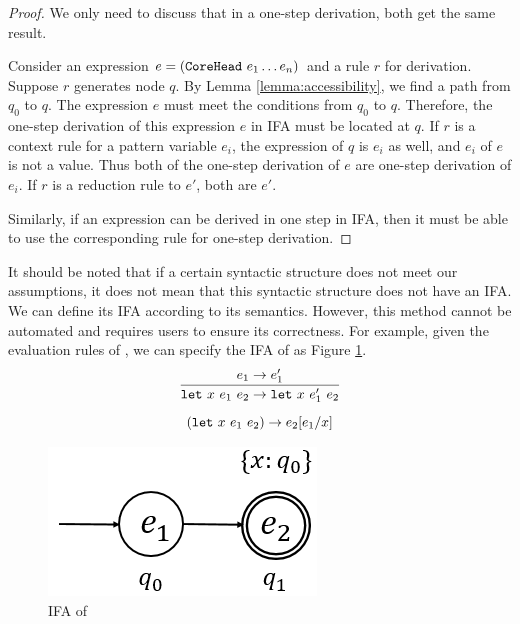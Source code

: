 \begin{proof}
    We only need to discuss that in a one-step derivation, both get the same result.

    Consider an expression $e=(\mbox{\tt CoreHead}~e_1 \ldots e_n)$ and a rule $r$ for derivation. Suppose $r$ generates node $q$. By Lemma \ref{lemma:accessibility}, we find a path from $q_0$ to $q$. The expression $e$ must meet the conditions from $q_0$ to $q$. Therefore, the one-step derivation of this expression $e$ in IFA must be located at $q$. If $r$ is a context rule for a pattern variable $e_i$, the expression of $q$ is $e_i$ as well, and $e_i$ of $e$ is not a value. Thus both of the one-step derivation of $e$ are one-step derivation of $e_i$. If $r$ is a reduction rule to $e'$, both are $e'$.

    Similarly, if an expression can be derived in one step in IFA, then it must be able to use the corresponding rule for one-step derivation.
\end{proof}


It should be noted that if a certain syntactic structure does not meet our assumptions, it does not mean that this syntactic structure does not have an IFA. We can define its IFA according to its semantics. However, this method cannot be automated and requires users to ensure its correctness. For example, given the evaluation rules of , we can specify the IFA of  as Figure \ref{fig:ifa-let}.
\[
    \infer{\m{let}~x~e_1~e_2 \to \m{let}~x~e_1'~e_2}{e_1 \to e_1'}
\]\[
    (\mbox{\tt let}~x~e_1~e_2) \to e_2[e_1/x]
\]


\begin{figure}[t]
    \centering
    \includegraphics[scale=0.25]{images/ifa/ifa-let.png}
    \caption{IFA of }
    \label{fig:ifa-let}
\end{figure}

